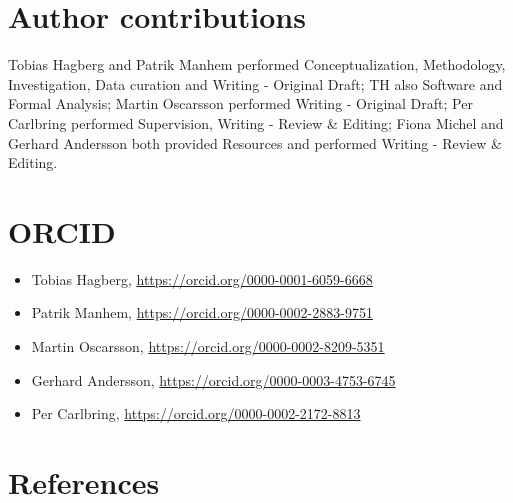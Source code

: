 \documentclass[3p]{elsarticle} %
\providecommand{\tightlist}{%
  \setlength{\itemsep}{0pt}\setlength{\parskip}{0pt}}
\begin{document}
\hypertarget{author-contributions}{%
\section{Author contributions}\label{author-contributions}}

Tobias Hagberg and Patrik Manhem performed Conceptualization,
Methodology, Investigation, Data curation and Writing - Original Draft;
TH also Software and Formal Analysis; Martin Oscarsson performed Writing
- Original Draft; Per Carlbring performed Supervision, Writing - Review
\& Editing; Fiona Michel and Gerhard Andersson both provided Resources
and performed Writing - Review \& Editing.

\hypertarget{orcid}{%
\section{ORCID}\label{orcid}}

\begin{itemize}
\tightlist
\item
  Tobias Hagberg, \url{https://orcid.org/0000-0001-6059-6668}
\item
  Patrik Manhem, \url{https://orcid.org/0000-0002-2883-9751}
\item
  Martin Oscarsson, \url{https://orcid.org/0000-0002-8209-5351}
\item
  Gerhard Andersson, \url{https://orcid.org/0000-0003-4753-6745}
\item
  Per Carlbring, \url{https://orcid.org/0000-0002-2172-8813}
\end{itemize}

\hypertarget{references}{%
\section{References}\label{references}}

\small
\end{document}
